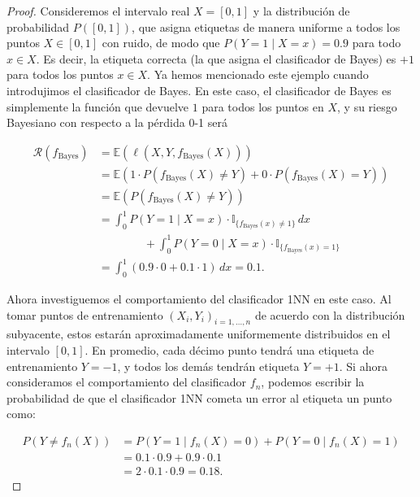 \documentclass{report}
\begin{document}
\begin{proof}

Consideremos 
el intervalo real \(X = [0, 1]\) y la distribución de probabilidad \(P([0, 1])\),  que asigna etiquetas 
de manera uniforme a todos los puntos \(X \in [0, 1]\) con ruido, de modo que 
\(P(Y = 1 \mid X = x) = 0.9\) para todo \(x \in X\). Es decir, la etiqueta correcta (la que 
asigna el clasificador de Bayes) es \(+1\) para todos los puntos \(x \in X\). Ya hemos mencionado 
este ejemplo cuando introdujimos el clasificador de Bayes. En este caso, el clasificador de Bayes 
es simplemente la función que devuelve \(1\) para todos los puntos en \(X\), y su riesgo Bayesiano 
con respecto a la pérdida 0-1 será

\[
\begin{aligned}
    \mathcal{R}(f_{\text{Bayes}}) & = \mathbb{E}(\ell(X,Y,f_{\text{Bayes}}(X))) \\
    & = \mathbb{E}(1\cdot P(f_{\text{Bayes}}(X)\neq Y) + 0 \cdot P(f_{\text{Bayes}}(X) = Y))\\
    & = \mathbb{E}(P(f_{\text{Bayes}}(X)\neq Y))\\
    & = \int_{0}^{1} P(Y = 1 \mid X = x) \cdot \mathbb{I}_{\{f_{\text{Bayes}}(x) \neq 1\}} \, dx \\
    & \qquad \qquad + \int_{0}^{1} P(Y=0 \mid X=x) \cdot \mathbb{I}_{\{f_{\text{Bayes}}(x) = 1\}} \\
    & = \int_{0}^{1} (0.9 \cdot 0 + 0.1 \cdot 1) \, dx = 0.1.
\end{aligned}
\]

Ahora investiguemos el comportamiento del clasificador 1NN 
en este caso. Al tomar puntos de entrenamiento \((X_i, Y_i)_{i=1,\dots,n}\) de acuerdo con la 
distribución subyacente, estos estarán aproximadamente uniformemente distribuidos en el intervalo 
\([0, 1]\). En promedio, cada décimo punto tendrá una etiqueta de entrenamiento \(Y = -1\), y todos 
los demás tendrán etiqueta \(Y = +1\). Si ahora consideramos el comportamiento del clasificador \(f_n\), 
podemos escribir la probabilidad de que el clasificador 1NN cometa un error al etiqueta un punto como:

\[
\begin{aligned}
P(Y \neq f_n(X)) & = P(Y = 1 \mid f_n(X) = 0) + P(Y = 0 \mid f_n(X) = 1) \\
                 & = 0.1 \cdot 0.9 + 0.9 \cdot 0.1 \\
                 & = 2 \cdot 0.1 \cdot 0.9 = 0.18.
\end{aligned}
\]


\end{proof}
\end{document}
